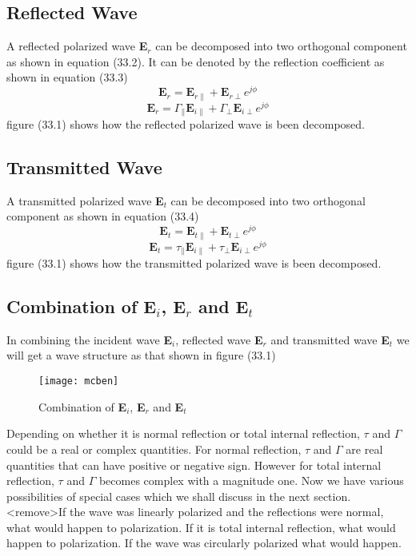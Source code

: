 \subsection{Reflected Wave}
A reflected polarized wave \textbf{E$_r$} can be decomposed into two orthogonal component as shown in equation (33.2). It can be denoted by the reflection coefficient as shown in equation (33.3)
\begin{equation}
\textbf{E}_r = \textbf{E}_{r\parallel} + \textbf{E}_{r\perp} e^{j\phi}
\end{equation}	
\begin{equation}
\textbf{E}_r = \Gamma_\parallel \textbf{E}_{i\parallel} + \Gamma_\perp \textbf{E}_{i\perp} e^{j\phi}
\end{equation}	
figure (33.1) shows how the reflected polarized wave is been decomposed.
\subsection{Transmitted Wave}
A transmitted polarized wave \textbf{E$_t$} can be decomposed into two orthogonal component as shown in equation (33.4)	
\begin{equation}
\textbf{E}_t = \textbf{E}_{t\parallel} + \textbf{E}_{t\perp} e^{j\phi}
\end{equation}	
\begin{equation}
\textbf{E}_t = \tau_\parallel \textbf{E}_{i\parallel} + \tau_\perp\textbf{E}_{i\perp} e^{j\phi}
\end{equation}	
figure (33.1) shows how the transmitted polarized wave is been decomposed.	
\subsection{Combination of \textbf{E$_i$}, \textbf{E$_r$} and \textbf{E$_t$}}
In combining the incident wave \textbf{E$_i$}, reflected wave \textbf{E$_r$} and transmitted wave \textbf{E$_t$} we will get a wave structure as that shown in figure (33.1)	
\begin{figure}
\centering
\texttt{[image: mcben]}
\caption{Combination of \textbf{E$_i$}, \textbf{E$_r$} and \textbf{E$_t$}}
\end{figure}
Depending on whether it is normal reflection or total internal reflection, $\tau$ and $\Gamma$ could be a real or complex quantities. For normal reflection, $\tau$ and $\Gamma$ are real quantities that can have positive or negative sign. However for total internal reflection, $\tau$ and $\Gamma$ becomes complex with a magnitude one. Now we have various possibilities of special cases which we shall discuss in the next section. <remove>If the wave was linearly polarized and the reflections were normal, what would happen to polarization. If it is total internal reflection, what would happen to polarization. If the wave was circularly polarized what would happen.
